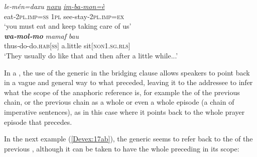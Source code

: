 \documentclass[output=paper]{LSP/langsci}
\begin{document}
	     
\begin{exe}
\ex \label{Devex:16ab}
\begin{xlist}
\ex \label{Devex:16a}			     
\gll \textit{le‑mén=daxu}  \underline{\textit{noxu}} \underline{\textit{im-ba‑mon=è}}\\
eat‑\textsc{2pl.imp=ss} \textsc{1pl} see‑stay‑\textsc{2pl.imp=ex}\\
\glt `you must eat and keep taking care of us'\\
 
\ex \label{Devex:16b}			     
\gll \textbf{\textit{wa‑mol‑mo}} \textit{mamaf} \textit{bau}\\    
thus‑do-do.\textsc{hab[ss]} a.little sit[\textsc{non1.sg.rls}]\\	
\glt `They usually do like that and then after a little while...'\\
\end{xlist}
\end{exe}
		
In a , the use of the generic  in the bridging clause allows speakers to point back in a vague  and general way to what preceded, leaving it to the addressee to infer what the scope of the anaphoric reference is, for example the  of the previous chain, or the previous chain as a whole or even  a whole episode (a chain of imperative sentences),  as in this case where it points back to the whole prayer episode that precedes.

In the next example (\ref{Devex:17ab}), the generic  seems to refer back to the  of the previous , although it can be taken to have the whole preceding  in its scope:
	
\end{document}
